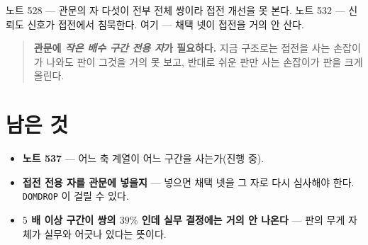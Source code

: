 \documentclass[11pt]{article}
\begin{document}
노트 528 --- 관문의 자 다섯이 전부 전체 쌍이라 접전 개선을 못 본다.
노트 532 --- 신뢰도 신호가 접전에서 침묵한다.
여기 --- 채택 넷이 접전을 거의 안 산다.

\begin{quote}
\textbf{관문에 \emph{작은 배수 구간 전용 자}가 필요하다.} 지금 구조로는 접전을
사는 손잡이가 나와도 판이 그것을 거의 못 보고, 반대로 쉬운 판만 사는 손잡이가
판을 크게 올린다.
\end{quote}

\section*{남은 것}

\begin{itemize}
\item \textbf{노트 537} --- 어느 축 계열이 어느 구간을 사는가(진행 중).
\item \textbf{접전 전용 자를 관문에 넣을지} --- 넣으면 채택 넷을 그 자로 다시
심사해야 한다. \texttt{DOMDROP} 이 걸릴 수 있다.
\item \textbf{$5$ 배 이상 구간이 쌍의 $39\%$ 인데 실무 결정에는 거의 안
나온다} --- 판의 무게 자체가 실무와 어긋나 있다는 뜻이다.
\end{itemize}
\end{document}
